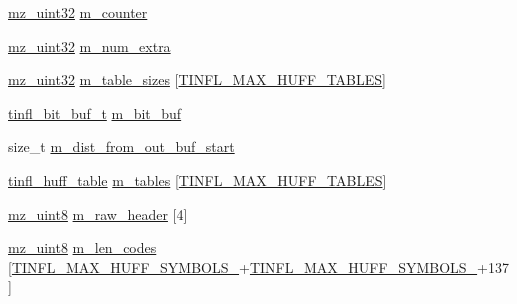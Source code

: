 \begin{DoxyCompactItemize}
\item 
\mbox{\hyperlink{tinfl_8c_ab1a91818a39ac203d5d9f12a003e8557}{mz\+\_\+uint32}} \mbox{\hyperlink{structtinfl__decompressor__tag_ae0751d6b36c3d710f8ba83019e890a18}{m\+\_\+counter}}
\item 
\mbox{\hyperlink{tinfl_8c_ab1a91818a39ac203d5d9f12a003e8557}{mz\+\_\+uint32}} \mbox{\hyperlink{structtinfl__decompressor__tag_aeca30360d877f2a99f6d6f0e94460382}{m\+\_\+num\+\_\+extra}}
\item 
\mbox{\hyperlink{tinfl_8c_ab1a91818a39ac203d5d9f12a003e8557}{mz\+\_\+uint32}} \mbox{\hyperlink{structtinfl__decompressor__tag_ac2c9488f8d9b25bf30309b73420a2452}{m\+\_\+table\+\_\+sizes}} \mbox{[}\mbox{\hyperlink{tinfl_8c_adf764cbdea00d65edcd07bb9953ad2b7ad908ef7390a1643b0f0dece0d816bd64}{T\+I\+N\+F\+L\+\_\+\+M\+A\+X\+\_\+\+H\+U\+F\+F\+\_\+\+T\+A\+B\+L\+ES}}\mbox{]}
\item 
\mbox{\hyperlink{tinfl_8c_af6af194c507342cda458498cd37ca418}{tinfl\+\_\+bit\+\_\+buf\+\_\+t}} \mbox{\hyperlink{structtinfl__decompressor__tag_a2d7972f0037f5244640aa6b0a049ee58}{m\+\_\+bit\+\_\+buf}}
\item 
size\+\_\+t \mbox{\hyperlink{structtinfl__decompressor__tag_a8481db744b76e770f54391d76f704c34}{m\+\_\+dist\+\_\+from\+\_\+out\+\_\+buf\+\_\+start}}
\item 
\mbox{\hyperlink{structtinfl__huff__table}{tinfl\+\_\+huff\+\_\+table}} \mbox{\hyperlink{structtinfl__decompressor__tag_af3ceba45e4c8727c214c618f3987f105}{m\+\_\+tables}} \mbox{[}\mbox{\hyperlink{tinfl_8c_adf764cbdea00d65edcd07bb9953ad2b7ad908ef7390a1643b0f0dece0d816bd64}{T\+I\+N\+F\+L\+\_\+\+M\+A\+X\+\_\+\+H\+U\+F\+F\+\_\+\+T\+A\+B\+L\+ES}}\mbox{]}
\item 
\mbox{\hyperlink{tinfl_8c_a9354eca32f90733aa9bb3738c92da596}{mz\+\_\+uint8}} \mbox{\hyperlink{structtinfl__decompressor__tag_aa3d6b1b25edb9394236255bf7242f7b2}{m\+\_\+raw\+\_\+header}} \mbox{[}4\mbox{]}
\item 
\mbox{\hyperlink{tinfl_8c_a9354eca32f90733aa9bb3738c92da596}{mz\+\_\+uint8}} \mbox{\hyperlink{structtinfl__decompressor__tag_a7b5666f8fdd4854701ca97b6cf80b830}{m\+\_\+len\+\_\+codes}} \mbox{[}\mbox{\hyperlink{tinfl_8c_adf764cbdea00d65edcd07bb9953ad2b7abc60f0bf72551ed7cbbf1ed9b20752ba}{T\+I\+N\+F\+L\+\_\+\+M\+A\+X\+\_\+\+H\+U\+F\+F\+\_\+\+S\+Y\+M\+B\+O\+L\+S\+\_}}+\mbox{\hyperlink{tinfl_8c_adf764cbdea00d65edcd07bb9953ad2b7ac44807ea07817afa2b5e97b5bfc204fb}{T\+I\+N\+F\+L\+\_\+\+M\+A\+X\+\_\+\+H\+U\+F\+F\+\_\+\+S\+Y\+M\+B\+O\+L\+S\+\_}}+137\mbox{]}
\end{DoxyCompactItemize}


